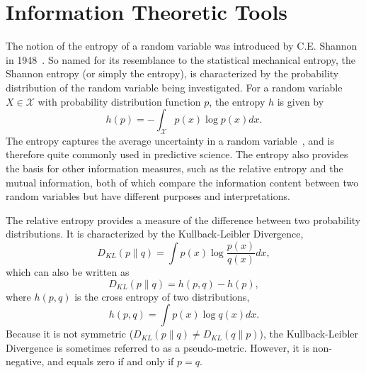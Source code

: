 \section{Information Theoretic Tools}\label{uq:info_theory}

The notion of the entropy of a random variable was introduced by C.E. 
Shannon in 1948~\cite{Sha1948}. So named for its resemblance to the statistical 
mechanical entropy, the Shannon entropy (or simply the entropy), is 
characterized by the probability distribution of the random variable being 
investigated. For a random variable $X \in \mathcal{X}$ with probability 
distribution function $p$, the entropy $h$ is given by
\begin{equation}
h(p) = -\int_{\mathcal{X}} p(x) \log p(x) dx.
\label{ent_cont}
\end{equation}
The entropy captures the average uncertainty in a random 
variable~\cite{Cov2006}, and is therefore quite commonly used in predictive 
science. The entropy also provides the basis for other information measures, 
such as the relative entropy and the mutual information, both of which compare 
the information content between two random variables but have different 
purposes and interpretations. 

The relative entropy provides a measure of the difference between two 
probability distributions. It is characterized by the Kullback-Leibler 
Divergence,
\begin{equation}
D_{KL}(p \| q) = \int p(x) \log \frac{p(x)}{q(x)} dx,
\label{dkl_discrete}
\end{equation}
which can also be written as 
\begin{equation}
D_{KL}( p \| q)  = h(p,q) - h(p),
\end{equation}
where $h(p,q)$ is the cross entropy of two distributions,
\begin{equation}
h(p,q) = \int p(x) \log q(x) dx.
\end{equation}
Because it is not symmetric ($D_{KL} (p \| q) \neq D_{KL} (q \| p)$), the 
Kullback-Leibler Divergence is sometimes referred to as a pseudo-metric. 
However, it is non-negative, and equals zero if and only if $p = q$. 


